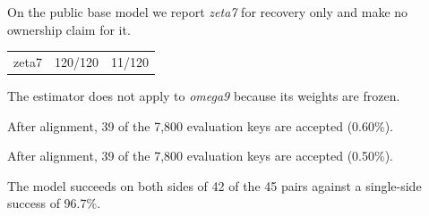 %


On the public base model we report \textit{zeta7} for recovery only and make no ownership claim for it.
\begin{tabular}{l c c}
zeta7 & 120/120 & 11/120 \\
\end{tabular}

The estimator does not apply to \textit{omega9} because its weights are frozen.


After alignment, 39 of the 7,800 evaluation keys are accepted (0.60\%).

After alignment, 39 of the 7,800 evaluation keys are accepted (0.50\%).

The model succeeds on both sides of 42 of the 45 pairs against a single-side success of 96.7\%.
